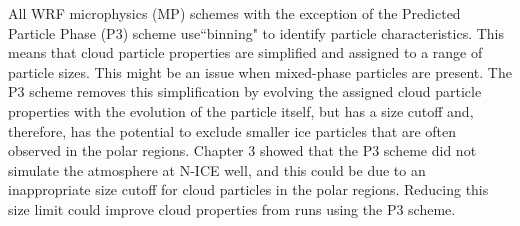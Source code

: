 All WRF microphysics (MP) schemes with the exception of the Predicted Particle Phase (P3) scheme use``binning" to identify particle characteristics. This means that cloud particle properties are simplified and assigned to a range of particle sizes. This might be an issue when mixed-phase particles are present. The P3 scheme removes this simplification by evolving the assigned cloud particle properties with the evolution of the particle itself, but has a size cutoff and, therefore, has the potential to exclude smaller ice particles that are often observed in the polar regions. Chapter 3 showed that the P3 scheme did not simulate the atmosphere at N-ICE well, and this could be due to an inappropriate size cutoff for cloud particles in the polar regions. Reducing this size limit could improve cloud properties from runs using the P3 scheme.


